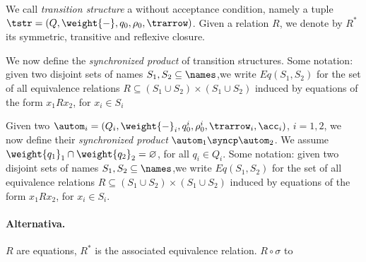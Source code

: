 \newcommand{\eq}[1]{#1}

We call \emph{transition structure} a \hdma{} without acceptance condition, namely a tuple $\tstr = (Q,\weight{-},q_0,\rho_0,\trarrow)$. Given a relation $R$, we denote by $R^*$ its symmetric, transitive and reflexive closure.

We now define the \emph{synchronized product} of transition structures.
Some notation: given two disjoint sets of names $S_1,S_2 \subseteq \names$,we write $Eq(S_1,S_2)$ for the set of all equivalence relations $R \subseteq (S_1 \cup S_2) \times (S_1 \cup S_2)$ induced by equations of the form $x_1 \eq{R} x_2$, for $x_i \in S_i$

Given two \hdmas{} $\autom_i = (Q_i,\weight{-}_i,q_0^i,\rho_0^i,\trarrow_i,\acc_i)$, $i=1,2$, we now define their \emph{synchronized product} $\autom_1 \syncp \autom_2$. We assume $\weight{q_1}_1 \cap \weight{q_2}_2 = \varnothing$, for all $q_i \in Q_i$. Some notation: given two disjoint sets of names $S_1,S_2 \subseteq \names$,we write $Eq(S_1,S_2)$ for the set of all equivalence relations $R \subseteq (S_1 \cup S_2) \times (S_1 \cup S_2)$ induced by equations of the form $x_1 \eq{R} x_2$, for $x_i \in S_i$. 

\paragraph{Alternativa.} $R$ are equations, $R^*$ is the associated equivalence relation. $R \circ \sigma$ to 

